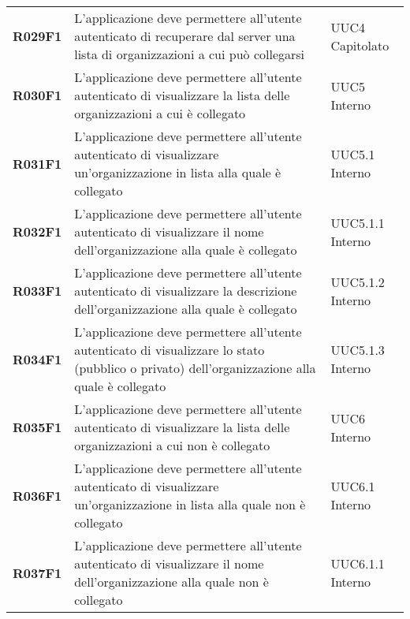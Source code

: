 \documentclass[../analisi-dei-requisiti.tex]{subfiles}
\begin{document}
\begin{longtable}[H]{>{\centering\bfseries}m{3cm} >{\centering}m{10cm} >{\centering\arraybackslash}m{3cm}}
  R029F1                               & L'applicazione deve permettere all'utente autenticato di recuperare dal server una lista di organizzazioni a cui può collegarsi                                                                         & UUC4 Capitolato               \\
  R030F1                               & L'applicazione deve permettere all'utente autenticato di visualizzare la lista delle organizzazioni a cui è collegato                                                                                   & UUC5 Interno                  \\
  R031F1                               & L'applicazione deve permettere all'utente autenticato di visualizzare un'organizzazione in lista alla quale è collegato                                                                                 & UUC5.1 Interno                \\
  R032F1                               & L'applicazione deve permettere all'utente autenticato di visualizzare il nome dell'organizzazione alla quale è collegato                                                                                & UUC5.1.1 Interno              \\
  R033F1                               & L'applicazione deve permettere all'utente autenticato di visualizzare la descrizione dell'organizzazione alla quale è collegato                                                                         & UUC5.1.2 Interno              \\
  R034F1                               & L'applicazione deve permettere all'utente autenticato di visualizzare lo stato (pubblico o privato) dell'organizzazione alla quale è collegato                                                          & UUC5.1.3 Interno              \\
  R035F1                               & L'applicazione deve permettere all'utente autenticato di visualizzare la lista delle organizzazioni a cui non è collegato                                                                               & UUC6 Interno                  \\
  R036F1                               & L'applicazione deve permettere all'utente autenticato di visualizzare un'organizzazione in lista alla quale non è collegato                                                                             & UUC6.1 Interno                \\
  R037F1                               & L'applicazione deve permettere all'utente autenticato di visualizzare il nome dell'organizzazione alla quale non è collegato                                                                            & UUC6.1.1 Interno              \\

\end{longtable}
\end{document}
